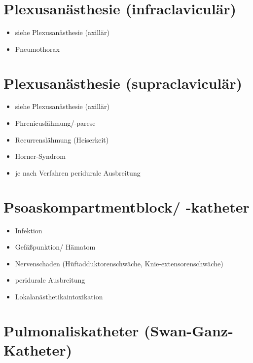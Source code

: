 \documentclass[
]{book}
\providecommand{\tightlist}{%
  \setlength{\itemsep}{0pt}\setlength{\parskip}{0pt}}
\begin{document}
\hypertarget{plexusanuxe4sthesie-infraclaviculuxe4r}{%
\section{Plexusanästhesie (infraclaviculär)}\label{plexusanuxe4sthesie-infraclaviculuxe4r}}

\begin{itemize}
\tightlist
\item
  siehe Plexusanästhesie (axillär)
\item
  Pneumothorax
\end{itemize}

\hypertarget{plexusanuxe4sthesie-supraclaviculuxe4r}{%
\section{Plexusanästhesie (supraclaviculär)}\label{plexusanuxe4sthesie-supraclaviculuxe4r}}

\begin{itemize}
\tightlist
\item
  siehe Plexusanästhesie (axillär)
\item
  Phrenicuslähmung/-parese
\item
  Recurrenslähmung (Heiserkeit)
\item
  Horner-Syndrom
\item
  je nach Verfahren peridurale Ausbreitung
\end{itemize}

\hypertarget{psoaskompartmentblock--katheter}{%
\section{Psoaskompartmentblock/ -katheter}\label{psoaskompartmentblock--katheter}}

\begin{itemize}
\tightlist
\item
  Infektion
\item
  Gefäßpunktion/ Hämatom
\item
  Nervenschaden (Hüftadduktorenschwäche, Knie-extensorenschwäche)
\item
  peridurale Ausbreitung
\item
  Lokalanästhetikaintoxikation
\end{itemize}

\hypertarget{pulmonaliskatheter-swan-ganz-katheter}{%
\section{Pulmonaliskatheter (Swan-Ganz-Katheter)}\label{pulmonaliskatheter-swan-ganz-katheter}}
\end{document}
